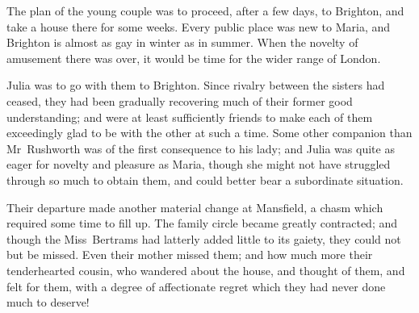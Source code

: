 The plan of the young couple was to proceed, after a few days, to Brighton, and take a house there for some weeks. Every public place was new to Maria, and Brighton is almost as gay in winter as in summer. When the novelty of amusement there was over, it would be time for the wider range of London.

Julia was to go with them to Brighton. Since rivalry between the sisters had ceased, they had been gradually recovering much of their former good understanding; and were at least sufficiently friends to make each of them exceedingly glad to be with the other at such a time. Some other companion than Mr~Rushworth was of the first consequence to his lady; and Julia was quite as eager for novelty and pleasure as Maria, though she might not have struggled through so much to obtain them, and could better bear a subordinate situation.

Their departure made another material change at Mansfield, a chasm which required some time to fill up. The family circle became greatly contracted; and though the Miss~Bertrams had latterly added little to its gaiety, they could not but be missed. Even their mother missed them; and how much more their tenderhearted cousin, who wandered about the house, and thought of them, and felt for them, with a degree of affectionate regret which they had never done much to deserve! 